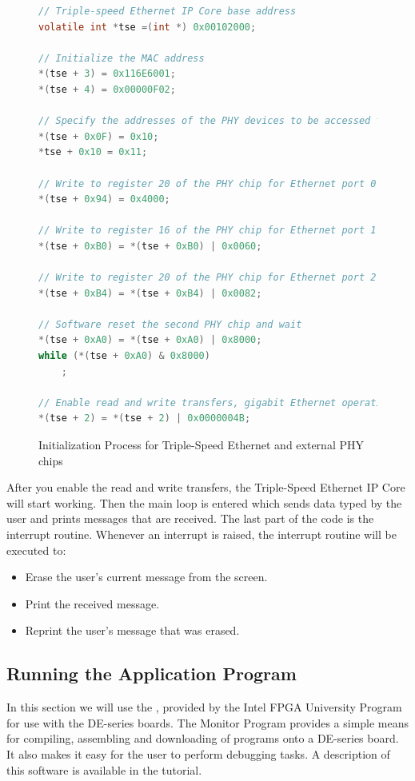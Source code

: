 \documentclass[11pt, twoside, pdftex]{article}
\begin{document}
\begin{figure}[H]
	\begin{lstlisting}[language=C]
// Triple-speed Ethernet IP Core base address
volatile int *tse =(int *) 0x00102000;

// Initialize the MAC address
*(tse + 3) = 0x116E6001;
*(tse + 4) = 0x00000F02;

// Specify the addresses of the PHY devices to be accessed through MDIO interface
*(tse + 0x0F) = 0x10;
*tse + 0x10 = 0x11;

// Write to register 20 of the PHY chip for Ethernet port 0 to set up line loopback
*(tse + 0x94) = 0x4000;

// Write to register 16 of the PHY chip for Ethernet port 1 to enable automatic crossover for all modes
*(tse + 0xB0) = *(tse + 0xB0) | 0x0060;

// Write to register 20 of the PHY chip for Ethernet port 2 to set up delay for input/output clk
*(tse + 0xB4) = *(tse + 0xB4) | 0x0082;

// Software reset the second PHY chip and wait
*(tse + 0xA0) = *(tse + 0xA0) | 0x8000;
while (*(tse + 0xA0) & 0x8000)
    ;

// Enable read and write transfers, gigabit Ethernet operation, and CRC forwarding
*(tse + 2) = *(tse + 2) | 0x0000004B;
	\end{lstlisting}
	\caption{Initialization Process for Triple-Speed Ethernet and external PHY chips}
	\label{fig:tse_initialization}
\end{figure}

After you enable the read and write transfers, the Triple-Speed Ethernet IP Core will start working. Then the main loop is entered which sends data typed by the user and prints messages that are received. The last part of the code is the interrupt routine. Whenever an interrupt is raised, the interrupt routine will be executed to:

\begin{itemize}
	\item Erase the user's current message from the screen.
	\item Print the received message.
	\item Reprint the user's message that was erased.
\end{itemize}

\subsection{Running the Application Program}
In this section we will use the {\it \productNameMed{}}, provided by the Intel FPGA University Program for use with the DE-series boards. The Monitor Program provides a simple means for compiling, assembling and downloading of programs onto a DE-series board. It also makes it easy for the user to perform debugging tasks. A description of this software is available in the {\it \productNameMed{}} tutorial. 
\end{document}
